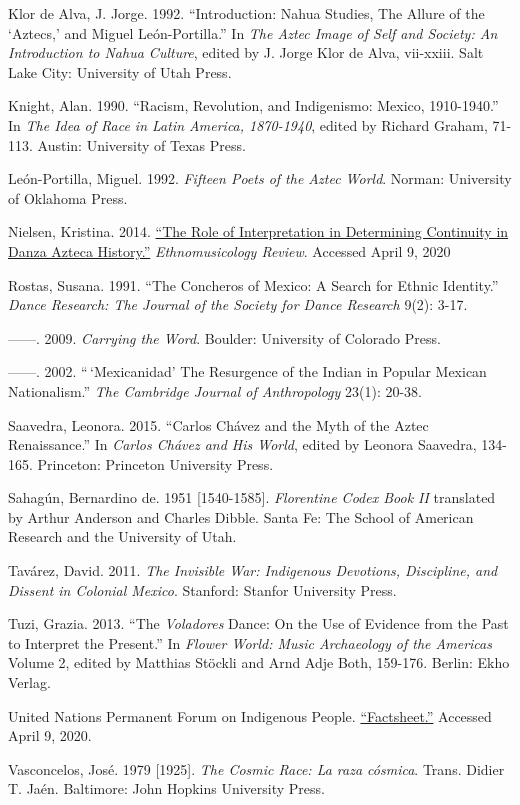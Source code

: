 \documentclass{article}
\begin{document}
\begin{hangparas}{15pt}{1}
 Klor de Alva, J. Jorge. 1992. ``Introduction: Nahua Studies,
The Allure of the `Aztecs,' and Miguel León-Portilla.'' In \emph{The
Aztec Image of Self and Society: An Introduction to Nahua Culture},
edited by J. Jorge Klor de Alva, vii-xxiii. Salt Lake City: University
of Utah Press.

 Knight, Alan. 1990. ``Racism, Revolution, and Indigenismo:
Mexico, 1910-1940.'' In \emph{The Idea of Race in Latin America,
1870-1940}, edited by Richard Graham, 71-113. Austin: University of
Texas Press.

 León-Portilla, Miguel. 1992. \emph{Fifteen Poets of the Aztec
World}. Norman: University of Oklahoma Press.

 Nielsen, Kristina. 2014.
\href{https://ethnomusicologyreview.ucla.edu/content/role-interpretation-determining-continuity-danza-azteca-history}{``The
Role of Interpretation in Determining Continuity in Danza Azteca
History.''} \emph{Ethnomusicology Review}. Accessed April 9, 2020

 Rostas, Susana. 1991. ``The Concheros of Mexico: A Search for
Ethnic Identity.'' \emph{Dance Research: The Journal of the Society for
Dance Research} 9(2): 3-17.

 ­­­------. 2009. \emph{Carrying the Word}. Boulder:
University of Colorado Press.

 ­­­------. 2002. ``\,`Mexicanidad' The Resurgence of the
Indian in Popular Mexican Nationalism.'' \emph{The Cambridge Journal of
Anthropology} 23(1): 20-38.

 Saavedra, Leonora. 2015. ``Carlos Chávez and the Myth of the
Aztec Renaissance.'' In \emph{Carlos Chávez and His World}, edited by
Leonora Saavedra, 134-165. Princeton: Princeton University Press.

 Sahagún, Bernardino de. 1951 {[}1540-1585{]}.
\emph{Florentine Codex Book II} translated by Arthur Anderson and
Charles Dibble. Santa Fe: The School of American Research and the
University of Utah.

 Tavárez, David. 2011. \emph{The Invisible War: Indigenous
Devotions, Discipline, and Dissent in Colonial Mexico}. Stanford:
Stanfor University Press.

 Tuzi, Grazia. 2013. ``The \emph{Voladores} Dance: On the Use
of Evidence from the Past to Interpret the Present.'' In \emph{Flower
World: Music Archaeology of the Americas} Volume 2, edited by Matthias
Stöckli and Arnd Adje Both, 159-176. Berlin: Ekho Verlag.

 United Nations Permanent Forum on Indigenous People.
\href{https://www.un.org/esa/socdev/unpfii/documents/5session_factsheet1.pdf}{``Factsheet.''}
Accessed April 9, 2020.

 Vasconcelos, José. 1979 {[}1925{]}. \emph{The Cosmic Race: La
raza cósmica}. Trans. Didier T. Jaén. Baltimore: John Hopkins University
Press.
\end{hangparas}
\end{document}
